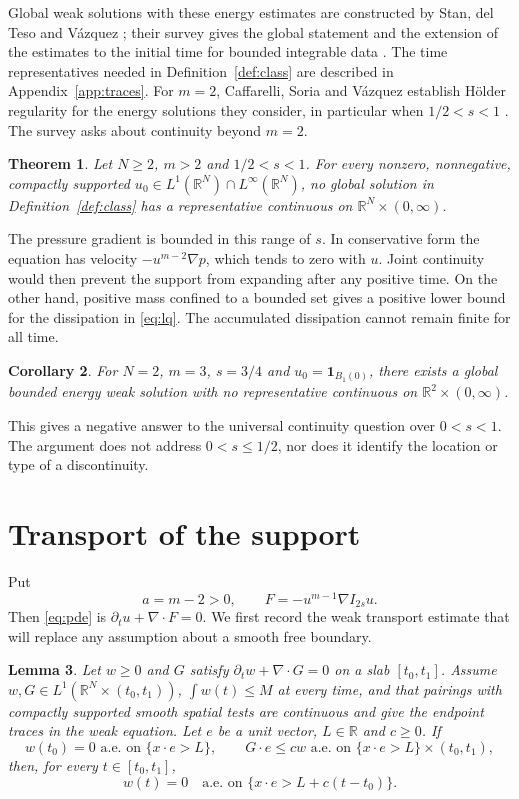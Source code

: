 \documentclass[11pt]{article}
\newtheorem{theorem}{Theorem}[section]
\newtheorem{corollary}[theorem]{Corollary}
\newtheorem{lemma}[theorem]{Lemma}
\theoremstyle{definition}
\newcommand{\R}{\mathbb R}
\begin{document}
Global weak solutions with these energy estimates are constructed by Stan, del Teso and V\'azquez \cite[Definition 2.1 and Theorem 2.2]{STVexist}; their survey gives the global statement and the extension of the estimates to the initial time for bounded integrable data \cite[Theorem 5.1 and Remark 4]{STVsurvey}. The time representatives needed in Definition~\ref{def:class} are described in Appendix~\ref{app:traces}.
For $m=2$, Caffarelli, Soria and V\'azquez establish H\"older regularity for the energy solutions they consider, in particular when $1/2<s<1$ \cite[Theorem 1.2]{CSV}. The survey \cite[Section 7]{STVsurvey} asks about continuity beyond $m=2$.

\begin{theorem}\label{thm:main}
Let $N\ge2$, $m>2$ and $1/2<s<1$. For every nonzero, nonnegative, compactly supported $u_0\in L^1(\R^N)\cap L^\infty(\R^N)$, no global solution in Definition~\ref{def:class} has a representative continuous on $\R^N\times(0,\infty)$.
\end{theorem}

The pressure gradient is bounded in this range of $s$. In conservative form the equation has velocity $-u^{m-2}\nabla p$, which tends to zero with $u$. Joint continuity would then prevent the support from expanding after any positive time. On the other hand, positive mass confined to a bounded set gives a positive lower bound for the dissipation in \eqref{eq:lq}. The accumulated dissipation cannot remain finite for all time.

\begin{corollary}\label{cor:witness}
For $N=2$, $m=3$, $s=3/4$ and $u_0=\mathbf1_{B_1(0)}$, there exists a global bounded energy weak solution with no representative continuous on $\R^2\times(0,\infty)$.
\end{corollary}

This gives a negative answer to the universal continuity question over $0<s<1$. The argument does not address $0<s\le1/2$, nor does it identify the location or type of a discontinuity.

\section{Transport of the support}
Put
\[
 a=m-2>0,\qquad F=-u^{m-1}\nabla I_{2s}u.
\]
Then \eqref{eq:pde} is $\partial_tu+\nabla\cdot F=0$. We first record the weak transport estimate that will replace any assumption about a smooth free boundary.

\begin{lemma}\label{lem:halfspace}
Let $w\ge0$ and $G$ satisfy $\partial_tw+\nabla\cdot G=0$ on a slab $[t_0,t_1]$. Assume $w,G\in L^1(\R^N\times(t_0,t_1))$, $\int w(t)\le M$ at every time, and that pairings with compactly supported smooth spatial tests are continuous and give the endpoint traces in the weak equation. Let $e$ be a unit vector, $L\in\R$ and $c\ge0$. If
\[
 w(t_0)=0\text{ a.e. on }\{x\cdot e>L\},\qquad
 G\cdot e\le cw\text{ a.e. on }\{x\cdot e>L\}\times(t_0,t_1),
\]
then, for every $t\in[t_0,t_1]$,
\[
 w(t)=0\quad\text{a.e. on }\{x\cdot e>L+c(t-t_0)\}.
\]
\end{lemma}
\end{document}
